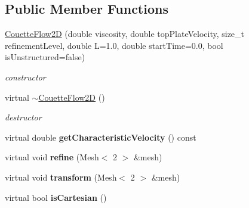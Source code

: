\subsection*{Public Member Functions}
\begin{DoxyCompactItemize}
\item 
\hyperlink{classnatrium_1_1CouetteFlow2D_a94e51b7eaff3998383f1d7dc07b994cb}{CouetteFlow2D} (double viscosity, double topPlateVelocity, size\_\-t refinementLevel, double L=1.0, double startTime=0.0, bool isUnstructured=false)
\begin{DoxyCompactList}\small\item\em constructor \item\end{DoxyCompactList}\item 
\hypertarget{classnatrium_1_1CouetteFlow2D_a97b61b0f71dc653427ba3db46e185873}{
virtual \hyperlink{classnatrium_1_1CouetteFlow2D_a97b61b0f71dc653427ba3db46e185873}{$\sim$CouetteFlow2D} ()}
\label{classnatrium_1_1CouetteFlow2D_a97b61b0f71dc653427ba3db46e185873}

\begin{DoxyCompactList}\small\item\em destructor \item\end{DoxyCompactList}\item 
\hypertarget{classnatrium_1_1CouetteFlow2D_a74429d98c455a0c06430a665505d8375}{
virtual double {\bfseries getCharacteristicVelocity} () const }
\label{classnatrium_1_1CouetteFlow2D_a74429d98c455a0c06430a665505d8375}

\item 
\hypertarget{classnatrium_1_1CouetteFlow2D_a4f2b1f26f932fec2815bfb08385ee20d}{
virtual void {\bfseries refine} (Mesh$<$ 2 $>$ \&mesh)}
\label{classnatrium_1_1CouetteFlow2D_a4f2b1f26f932fec2815bfb08385ee20d}

\item 
\hypertarget{classnatrium_1_1CouetteFlow2D_a1f6ae268733802c9dc2e8ff29f23a7f8}{
virtual void {\bfseries transform} (Mesh$<$ 2 $>$ \&mesh)}
\label{classnatrium_1_1CouetteFlow2D_a1f6ae268733802c9dc2e8ff29f23a7f8}

\item 
\hypertarget{classnatrium_1_1CouetteFlow2D_af5a31e19f94884c50ac56698a7a89476}{
virtual bool {\bfseries isCartesian} ()}
\label{classnatrium_1_1CouetteFlow2D_af5a31e19f94884c50ac56698a7a89476}

\end{DoxyCompactItemize}


